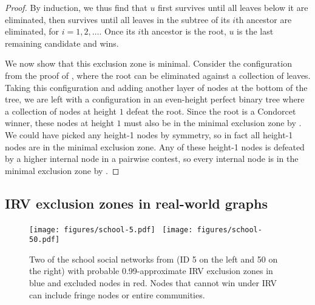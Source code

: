 \documentclass{article}
\theoremstyle{theorem}
\theoremstyle{definition}
\begin{document}
\begin{proof}
By induction, we thus find that $u$ first survives until all leaves below it are eliminated, then survives until all leaves in the subtree of its $i$th ancestor are eliminated, for $i=1, 2,\dots$. Once its $i$th ancestor is the root, $u$ is the last remaining candidate and wins. 

We now show that this exclusion zone is minimal. Consider the configuration from the proof of , where the root can be eliminated against a collection of leaves. Taking this configuration and adding another layer of nodes at the bottom of the tree, we are left with a configuration in an even-height perfect binary tree where a collection of nodes at height $1$ defeat the root. Since the root is a Condorcet winner, these nodes at height $1$ must also be in the minimal exclusion zone by . We could have picked any height-1 nodes by symmetry, so in fact all height-1 nodes are in the minimal exclusion zone. Any of these height-1 nodes is defeated by a higher internal node in a pairwise contest, so every internal node is in the minimal exclusion zone by . 
\end{proof}


\subsection{IRV exclusion zones in real-world graphs}


\begin{figure}
\centering
\texttt{[image: figures/school-5.pdf]}~
\texttt{[image: figures/school-50.pdf]}
\caption{Two of the school social networks from \citet{paluck2016data} (ID 5 on the left and 50 on the right) with probable 0.99-approximate IRV exclusion zones in blue and excluded nodes in red. Nodes that cannot win under IRV can include fringe nodes or entire communities.}  \label{fig:schools} 
\end{figure}
\end{document}
